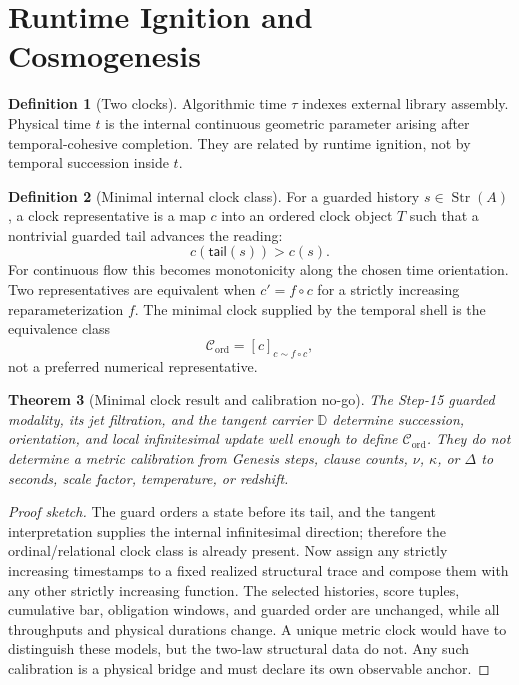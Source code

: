 \documentclass[11pt]{article}
\theoremstyle{plain}
\newtheorem{theorem}{Theorem}[section]
\theoremstyle{definition}
\newtheorem{definition}[theorem]{Definition}
\theoremstyle{remark}
\newenvironment{proofsketch}{\begin{proof}[Proof sketch]}{\end{proof}}
\newcommand{\Str}{\operatorname{Str}}
\newcommand{\D}{\mathbb{D}}
\begin{document}
\section{Runtime Ignition and Cosmogenesis}

\begin{definition}[Two clocks]
Algorithmic time \(\tau\) indexes external library assembly. Physical time \(t\) is the internal continuous geometric parameter arising after temporal-cohesive completion. They are related by runtime ignition, not by temporal succession inside \(t\).
\end{definition}

\begin{definition}[Minimal internal clock class]
For a guarded history \(s\in\Str(A)\), a clock representative is a map \(c\) into an ordered clock object \(T\) such that a nontrivial guarded tail advances the reading:
\[
c(\mathsf{tail}(s))>c(s).
\]
For continuous flow this becomes monotonicity along the chosen time orientation. Two representatives are equivalent when \(c' = f\circ c\) for a strictly increasing reparameterization \(f\). The minimal clock supplied by the temporal shell is the equivalence class
\[
\mathcal{C}_{\mathrm{ord}}=[c]_{c\sim f\circ c},
\]
not a preferred numerical representative.
\end{definition}

\begin{theorem}[Minimal clock result and calibration no-go]
The Step-15 guarded modality, its jet filtration, and the tangent carrier \(\D\) determine succession, orientation, and local infinitesimal update well enough to define \(\mathcal{C}_{\mathrm{ord}}\). They do not determine a metric calibration from Genesis steps, clause counts, \(\nu\), \(\kappa\), or \(\Delta\) to seconds, scale factor, temperature, or redshift.
\end{theorem}

\begin{proofsketch}
The guard orders a state before its tail, and the tangent interpretation supplies the internal infinitesimal direction; therefore the ordinal/relational clock class is already present. Now assign any strictly increasing timestamps to a fixed realized structural trace and compose them with any other strictly increasing function. The selected histories, score tuples, cumulative bar, obligation windows, and guarded order are unchanged, while all throughputs and physical durations change. A unique metric clock would have to distinguish these models, but the two-law structural data do not. Any such calibration is a physical bridge and must declare its own observable anchor.
\end{proofsketch}
\end{document}
